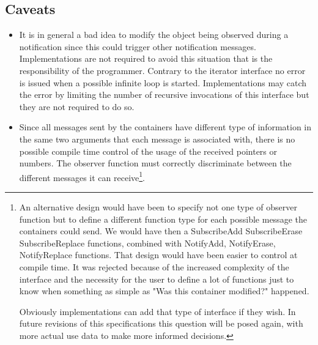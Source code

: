 \documentclass[12pt,a4paper,openany]{memoir} %
\begin{document}
\subsection{Caveats}
\begin{itemize}
\item
It is in general a bad idea to modify the object being observed during a notification since this could trigger other notification
messages. Implementations are not required to avoid this situation that is the responsibility of the programmer. Contrary to the iterator interface
no error is issued when a possible infinite loop is started. Implementations may catch the error by limiting the number of recursive
invocations of this interface but they are not required to do so.
\item
Since all messages sent by the containers have different type of information in the same two arguments that each message is associated with,
there is no possible compile time control of the usage of the received pointers or numbers. The observer function must correctly 
discriminate between the different messages it can receive\footnote{An alternative design would have been to specify not one type of
observer function but to define a different function type for each possible message the containers could send. We would have then a SubscribeAdd
SubscribeErase SubscribeReplace functions, combined with NotifyAdd, NotifyErase, NotifyReplace functions. That design would have been easier to
control at compile time. It was rejected because of the increased complexity of the interface and the necessity for the user to define a lot
of functions just to know when something as simple as "Was this container modified?" happened.

Obviously implementations can add that type of interface if they wish. In future revisions of this specifications this question will be posed again, with more actual use data to make more informed decisions.}.
\end{itemize}
\end{document}
